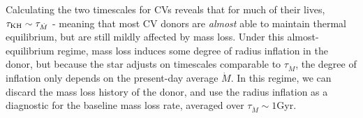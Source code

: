 Calculating the two timescales for CVs reveals that for much of their lives, $\tau_{\rm KH} \sim \tau_{\dot M}$ \citep{knigge11} - meaning that most CV donors are \textit{almost} able to maintain thermal equilibrium, but are still mildly affected by mass loss.
Under this almost-equilibrium regime, mass loss induces some degree of radius inflation in the donor, but because the star adjusts on timescales comparable to $\tau_{\dot M}$, the degree of inflation only depends on the present-day average $\dot M$. In this regime, we can discard the mass loss history of the donor, and use the radius inflation as a diagnostic for the baseline mass loss rate, averaged over $\tau_{\dot M} \sim 1$Gyr.


